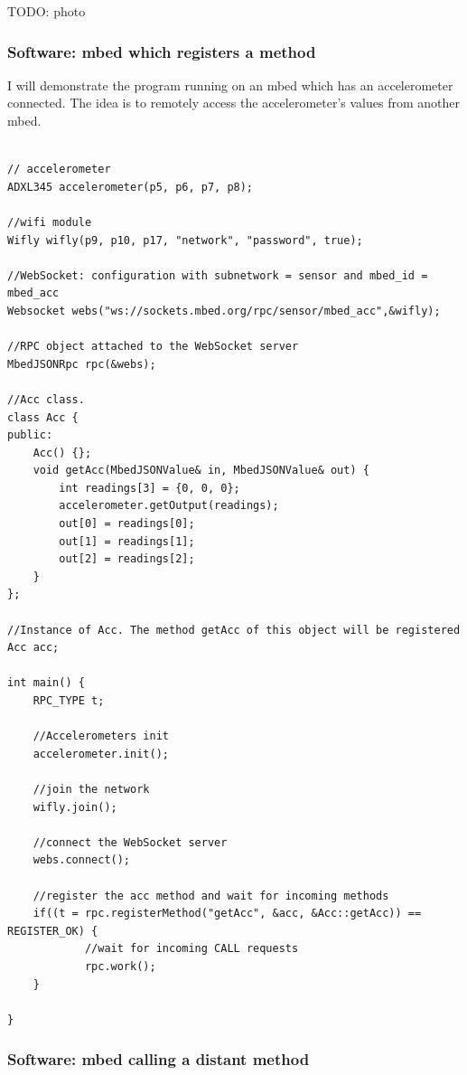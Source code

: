 \documentclass[pdftex,10pt,a4paper]{report}
\begin{document}
TODO: photo

\subsubsection{Software: mbed which registers a method}
I will demonstrate the program running on an mbed which has an accelerometer connected. The idea is to remotely access the accelerometer's values from another mbed.

\begin{lstlisting}[label=Client which registers a method,caption=Client which registers a method]

// accelerometer
ADXL345 accelerometer(p5, p6, p7, p8);

//wifi module
Wifly wifly(p9, p10, p17, "network", "password", true);

//WebSocket: configuration with subnetwork = sensor and mbed_id = mbed_acc 
Websocket webs("ws://sockets.mbed.org/rpc/sensor/mbed_acc",&wifly);

//RPC object attached to the WebSocket server
MbedJSONRpc rpc(&webs);

//Acc class. 
class Acc {
public:
    Acc() {};
    void getAcc(MbedJSONValue& in, MbedJSONValue& out) {
        int readings[3] = {0, 0, 0};
        accelerometer.getOutput(readings);
        out[0] = readings[0];
        out[1] = readings[1];
        out[2] = readings[2];
    }
};

//Instance of Acc. The method getAcc of this object will be registered
Acc acc;

int main() {
    RPC_TYPE t;
    
    //Accelerometers init
    accelerometer.init();
    
    //join the network
    wifly.join();
    
    //connect the WebSocket server
    webs.connect();

    //register the acc method and wait for incoming methods
    if((t = rpc.registerMethod("getAcc", &acc, &Acc::getAcc)) == REGISTER_OK) {
    		//wait for incoming CALL requests
    		rpc.work(); 
    }
    
}
\end{lstlisting}

\subsubsection{Software: mbed calling a distant method}
\end{document}
